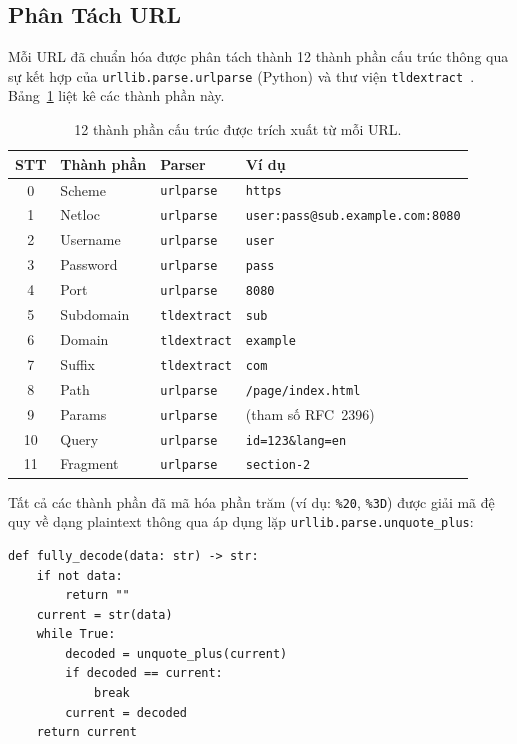 \documentclass[a4paper,12pt]{article}
\begin{document}
\subsection{Phân Tách URL}

Mỗi URL đã chuẩn hóa được phân tách thành 12 thành phần cấu trúc thông qua sự kết hợp của \texttt{urllib.parse.urlparse} (Python) và thư viện \texttt{tldextract}~\cite{tldextract}. Bảng~\ref{tab:url_components} liệt kê các thành phần này.

\begin{table}[H]
\centering
\caption{12 thành phần cấu trúc được trích xuất từ mỗi URL.}
\label{tab:url_components}
\begin{tabular}{clll}
\toprule
\textbf{STT} & \textbf{Thành phần} & \textbf{Parser} & \textbf{Ví dụ} \\
\midrule
0  & Scheme     & \texttt{urlparse}   & \texttt{https} \\
1  & Netloc     & \texttt{urlparse}   & \texttt{user:pass@sub.example.com:8080} \\
2  & Username   & \texttt{urlparse}   & \texttt{user} \\
3  & Password   & \texttt{urlparse}   & \texttt{pass} \\
4  & Port       & \texttt{urlparse}   & \texttt{8080} \\
5  & Subdomain  & \texttt{tldextract} & \texttt{sub} \\
6  & Domain     & \texttt{tldextract} & \texttt{example} \\
7  & Suffix     & \texttt{tldextract} & \texttt{com} \\
8  & Path       & \texttt{urlparse}   & \texttt{/page/index.html} \\
9  & Params     & \texttt{urlparse}   & (tham số RFC~2396) \\
10 & Query      & \texttt{urlparse}   & \texttt{id=123\&lang=en} \\
11 & Fragment   & \texttt{urlparse}   & \texttt{section-2} \\
\bottomrule
\end{tabular}
\end{table}

Tất cả các thành phần đã mã hóa phần trăm (ví dụ: \texttt{\%20}, \texttt{\%3D}) được giải mã đệ quy về dạng plaintext thông qua áp dụng lặp \texttt{urllib.parse.unquote\_plus}:

\begin{lstlisting}[caption={Giải mã percent-encoding đệ quy}]
def fully_decode(data: str) -> str:
    if not data:
        return ""
    current = str(data)
    while True:
        decoded = unquote_plus(current)
        if decoded == current:
            break
        current = decoded
    return current
\end{lstlisting}
\end{document}
